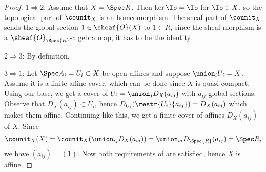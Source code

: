 
\begin{proof}
$1 \Rightarrow 2$:
Assume that $X = \Spec R$.
Then $\ker{\Ip} = \Ip$ for $\Ip \in X$, so the topological part of $\counit_X$ is an homeomorphism.
The sheaf part of $\counit_X$ sends the global section $1\in \sheaf{O}(X)$ to $1 \in R$,
since the sheaf morphism is a $\sheaf{O}_{\Spec{R}}$-algebra map, it has to be the identity.

$2 \Rightarrow 3$:
By definition.

$3 \Rightarrow 1$:
Let $\Spec A_i = U_i \subset X$ be open affines
and suppose $\union_i U_i = X$.
Assume it is a finite affine cover, which can be done since $X$ is quasi-compact.
Using our base, 
we get a cover of $U_i = \union_j D_X(a_{ij})$ 
with $a_{ij}$ global sections.
Observe that $D_X(a_{ij})\subset U_i$, 
hence $D_{U_i}(\restr{U_i}{a_{ij}}) = D_X(a_{ij})$
which makes them affine.
Continuing like this, 
we get a finite cover of affines $D_X(a_{ij})$ of $X$.
Since 
\[ \counit_X(X) = \counit_X(\union_{ij} D_X(a_{ij})) = \union_{ij} D_{\Spec{R}}(a_{ij}) = \Spec R,\]
we have $(a_{ij})=(1)$.
Now both requirements of  are satisfied,
hence $X$ is affine.
\end{proof}